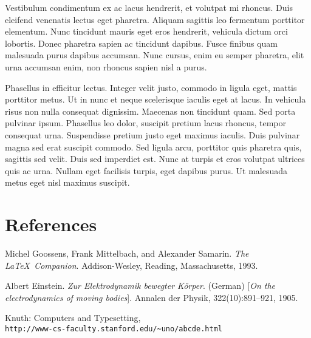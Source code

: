 \documentclass[8pt]{article}
\begin{document}
\begin{multicols}{2}
Vestibulum condimentum ex ac lacus hendrerit, et volutpat mi rhoncus. Duis eleifend venenatis lectus eget pharetra. Aliquam sagittis leo fermentum porttitor elementum. Nunc tincidunt mauris eget eros hendrerit, vehicula dictum orci lobortis. Donec pharetra sapien ac tincidunt dapibus. Fusce finibus quam malesuada purus dapibus accumsan. Nunc cursus, enim eu semper pharetra, elit urna accumsan enim, non rhoncus sapien nisl a purus.

Phasellus in efficitur lectus. Integer velit justo, commodo in ligula eget, mattis porttitor metus. Ut in nunc et neque scelerisque iaculis eget at lacus. In vehicula risus non nulla consequat dignissim. Maecenas non tincidunt quam. Sed porta pulvinar ipsum. Phasellus leo dolor, suscipit pretium lacus rhoncus, tempor consequat urna. Suspendisse pretium justo eget maximus iaculis. Duis pulvinar magna sed erat suscipit commodo. Sed ligula arcu, porttitor quis pharetra quis, sagittis sed velit. Duis sed imperdiet est. Nunc at turpis et eros volutpat ultrices quis ac urna. Nullam eget facilisis turpis, eget dapibus purus. Ut malesuada metus eget nisl maximus suscipit. 

\section{References}


\begin{thebibliography}{7}
Michel Goossens, Frank Mittelbach, and Alexander Samarin. 
\textit{The \LaTeX\ Companion}. 
Addison-Wesley, Reading, Massachusetts, 1993.
 
Albert Einstein. 
\textit{Zur Elektrodynamik bewegter K{\"o}rper}. (German) 
[\textit{On the electrodynamics of moving bodies}]. 
Annalen der Physik, 322(10):891–921, 1905.
 
Knuth: Computers and Typesetting,
\\\texttt{http://www-cs-faculty.stanford.edu/\~{}uno/abcde.html}
\end{thebibliography}



\end{multicols}
\end{document}
